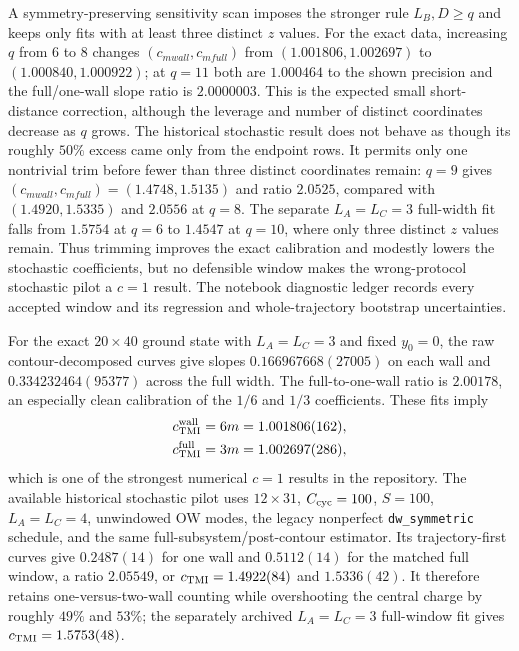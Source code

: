\documentclass[aps,prb,twocolumn,floatfix,nofootinbib,superscriptaddress]{revtex4-2}
\begin{document}
A symmetry-preserving sensitivity scan imposes the stronger rule $L_B,D\geq q$ and keeps
only fits with at least three distinct $z$ values.  For the exact data, increasing $q$ from
$6$ to $8$ changes $(c_{
m wall},c_{
m full})$ from
$(1.001806,1.002697)$ to $(1.000840,1.000922)$; at $q=11$ both are
$1.000464$ to the shown precision and the full/one-wall slope ratio is $2.0000003$.
This is the expected small short-distance correction, although the leverage and number of
distinct coordinates decrease as $q$ grows.  The historical stochastic result does not
behave as though its roughly $50\%$ excess came only from the endpoint rows.  It permits
only one nontrivial trim before fewer than three distinct coordinates remain: $q=9$ gives
$(c_{
m wall},c_{
m full})=(1.4748,1.5135)$ and ratio $2.0525$, compared with
$(1.4920,1.5335)$ and $2.0556$ at $q=8$.  The separate $L_A=L_C=3$ full-width fit falls
from $1.5754$ at $q=6$ to $1.4547$ at $q=10$, where only three distinct $z$ values remain.
Thus trimming improves the exact calibration and modestly lowers the stochastic
coefficients, but no defensible window makes the wrong-protocol stochastic pilot a
$c=1$ result.  The notebook diagnostic ledger records every accepted window and its
regression and whole-trajectory bootstrap uncertainties.

For the exact $20\times40$ ground state with $L_A=L_C=3$ and fixed $y_0=0$, the raw
contour-decomposed curves give slopes $0.166967668(27005)$ on each wall and
$0.334232464(95377)$ across the full width.  The full-to-one-wall ratio is $2.00178$, an
especially clean calibration of the $1/6$ and $1/3$ coefficients.  These fits imply
\begin{equation}
 \begin{aligned}
 c_{\rm TMI}^{\rm wall}&=6m=1.001806(162),\\
 c_{\rm TMI}^{\rm full}&=3m=1.002697(286),
 \end{aligned}
\end{equation}
which is one of the strongest numerical $c=1$ results in the repository.  The available
historical stochastic pilot uses $12\times31$, $C_{\rm cyc}=100$, $S=100$,
$L_A=L_C=4$, unwindowed OW modes, the legacy nonperfect
\texttt{dw\_symmetric} schedule, and the same full-subsystem/post-contour estimator.
Its trajectory-first curves give $0.2487(14)$ for one wall and $0.5112(14)$ for the
matched full window, a ratio $2.05549$, or $c_{\rm TMI}=1.4922(84)$ and $1.5336(42)$.
It therefore retains one-versus-two-wall counting while overshooting the central charge by
roughly $49\%$ and $53\%$; the separately archived $L_A=L_C=3$ full-window fit gives
$c_{\rm TMI}=1.5753(48)$.
\end{document}
